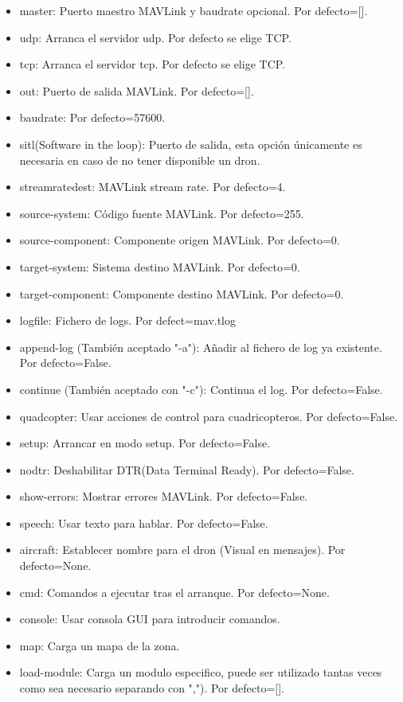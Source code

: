 \begin{multicols}{2}
\begin{itemize}
\item master: Puerto maestro MAVLink y baudrate opcional. Por defecto=[].
\item udp: Arranca el servidor udp. Por defecto se elige TCP.
\item tcp: Arranca el servidor tcp. Por defecto se elige TCP.
\item out: Puerto de salida MAVLink. Por defecto=[].
\item baudrate: Por defecto=57600.
\item sitl(Software in the loop): Puerto de salida, esta opción únicamente es necesaria en caso de no tener disponible un dron.
\item streamratedest: MAVLink stream rate. Por defecto=4.
\item source-system: Código fuente MAVLink. Por defecto=255.
\item source-component: Componente origen MAVLink. Por defecto=0.
\item target-system: Sistema destino MAVLink. Por defecto=0.
\item target-component: Componente destino MAVLink. Por defecto=0.
\item logfile: Fichero de logs. Por defect=mav.tlog
\item append-log (También aceptado "-a"): Añadir al fichero de log ya existente. Por defecto=False.
\item continue (También aceptado con "-c"): Continua el log. Por defecto=False.
\item quadcopter: Usar acciones de control para cuadricopteros. Por defecto=False.
\item setup: Arrancar en modo setup. Por defecto=False.
\item nodtr: Deshabilitar DTR(Data Terminal Ready). Por defecto=False.
\item show-errors: Mostrar errores MAVLink. Por defecto=False.
\item speech: Usar texto para hablar. Por defecto=False.
\item aircraft: Establecer nombre para el dron (Visual en mensajes). Por defecto=None.
\item cmd: Comandos a ejecutar tras el arranque. Por defecto=None.
\item console: Usar consola GUI para introducir comandos. 
\item map: Carga un mapa de la zona.
\item load-module: Carga un modulo especifico, puede ser utilizado tantas veces como sea necesario separando con ","). Por defecto=[].

\end{itemize}
\end{multicols}
